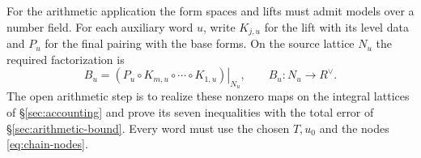 For the arithmetic application the form spaces and lifts must admit
models over a number field. For each auxiliary word $u$, write
$K_{j,u}$ for the lift with its level data and $P_u$ for the final
pairing with the base forms. On the source lattice $N_u$ the required
factorization is \citep[Eq.~(15.5)]{adriazola-grh}
\[
    B_u=\left.(P_u\circ K_{m,u}\circ\cdots\circ K_{1,u})\right|_{N_u},
    \qquad B_u\colon N_u\to R^\vee .
\]
The open arithmetic step is to realize these nonzero maps on the
integral lattices of \S\ref{sec:accounting} and prove its seven
inequalities with the total error of \S\ref{sec:arithmetic-bound}.
Every word must use the chosen $T,u_0$ and the nodes
\eqref{eq:chain-nodes}.
